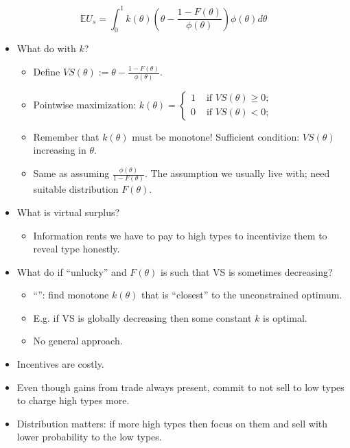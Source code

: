 \documentclass[english,handout]{beamer}		%
\def\lyxframeend{} %
\begin{document}
\begin{equation*}
\mathbb{E} U_s = \int_0^1 k(\theta) \left( \theta - \frac{1-F(\theta)}{\phi(\theta)} \right) \phi(\theta) d\theta
\end{equation*}
\begin{itemize}
	\item What do with $k$?
	\begin{itemize}[<+->]
		\item Define  $VS(\theta) := \theta - \frac{1-F(\theta)}{\phi(\theta)}$.
		\item Pointwise maximization: 
			$k(\theta) = \begin{cases}
				1 & \text{ if } VS(\theta) \geq 0;
				\\ 0 & \text{ if } VS(\theta) < 0;
			\end{cases}$
		\item Remember that $k(\theta)$ must be monotone! Sufficient condition: $VS(\theta)$ increasing in $\theta$.
		\item Same as assuming  $\frac{\phi(\theta)}{1-F(\theta)}$. The assumption we usually live with; need suitable distribution $F(\theta)$.
	\end{itemize}
\end{itemize}
\lyxframeend


\begin{itemize}
	\item What is virtual surplus?
	\begin{itemize}
		\item Information rents we have to pay to high types to incentivize them to reveal type honestly.
	\end{itemize}
	\item What do if ``unlucky'' and $F(\theta)$ is such that VS is sometimes decreasing?
	\begin{itemize}
		\item ``'': find monotone $k(\theta)$ that is ``closest'' to the unconstrained optimum.
		\item E.g. if VS is globally decreasing then some constant $k$ is optimal.
		\item No general approach.
	\end{itemize}
\end{itemize}
\lyxframeend


\begin{itemize}
	\item Incentives are costly.
	\item Even though gains from trade always present, commit to not sell to low types to charge high types more.
	\item Distribution matters: if more high types then focus on them and sell with lower probability to the low types.
\end{itemize}
\lyxframeend
\end{document}
